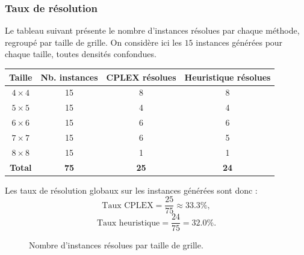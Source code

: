 \subsubsection{Taux de résolution}

Le tableau suivant présente le nombre d'instances résolues par chaque méthode, regroupé par taille de grille. On considère ici les \(15\) instances générées pour chaque taille, toutes densités confondues.

\begin{center}
\renewcommand{\arraystretch}{1.2}
\begin{tabular}{c|c|c|c}
\hline
\textbf{Taille} & \textbf{Nb. instances} & \textbf{CPLEX résolues} & \textbf{Heuristique résolues} \\
\hline
\(4 \times 4\) & 15 & 8 & 8 \\
\(5 \times 5\) & 15 & 4 & 4 \\
\(6 \times 6\) & 15 & 6 & 6 \\
\(7 \times 7\) & 15 & 6 & 5 \\
\(8 \times 8\) & 15 & 1 & 1 \\
\hline
\textbf{Total} & \textbf{75} & \textbf{25} & \textbf{24} \\
\hline
\end{tabular}
\end{center}

Les taux de résolution globaux sur les instances générées sont donc :
\[
\text{Taux CPLEX} = \frac{25}{75} \approx 33.3\%,
\]
\[
\text{Taux heuristique} = \frac{24}{75} = 32.0\%.
\]


\begin{figure}[H]
\centering
{}
\caption{Nombre d'instances résolues par taille de grille.}
\end{figure}

